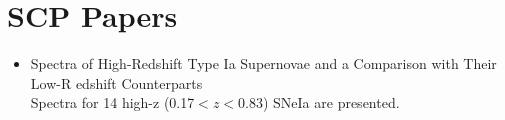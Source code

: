 \chapter{SCP Papers}
\begin{itemize}
\item Spectra of High-Redshift Type Ia Supernovae and a Comparison with Their Low-R
edshift Counterparts \citep[][\#]{hook05a}\\
Spectra for 14 high-z (0.17$< z < $0.83) SNeIa are presented.
\end{itemize}
